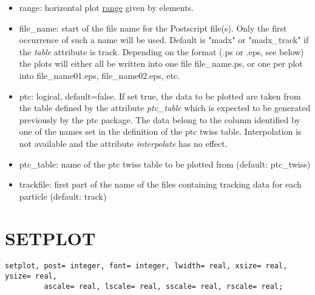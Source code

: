 \begin{itemize}
   \item range: horizontal plot
     \href{../Introduction/ranges.html}{range} given by elements.  

   \item file\_name: start of the file name for the Postscript
     file(s). Only the first occurrence of such a name will be
     used. Default is "madx" or "madx\_track" if the \textit{table}
     attribute is track.  Depending on the format (.ps or .eps, see
     below) the plots will either all be written into one file
     file\_name.ps, or one per plot into file\_name01.eps,
     file\_name02.eps, etc.   

   \item ptc: logical, default=false. If set true, the data to be
     plotted are taken from the table defined by the attribute
     \textit{ptc\_table} which is expected to be generated previously by
     the ptc package. The data belong to the column identified by one of
     the names set in the definition of the ptc twiss
     table. Interpolation is not available and the attribute
     \textit{interpolate} has no effect.   

   \item ptc\_table: name of the ptc twiss table to be plotted from
     (default: ptc\_twiss)  

   \item trackfile: first part of the name of the files containing
     tracking data for each particle (default: track)  
\end{itemize}


\section{SETPLOT}
\begin{verbatim}
setplot, post= integer, font= integer, lwidth= real, xsize= real, ysize= real,
         ascale= real, lscale= real, sscale= real, rscale= real;
\end{verbatim} 

